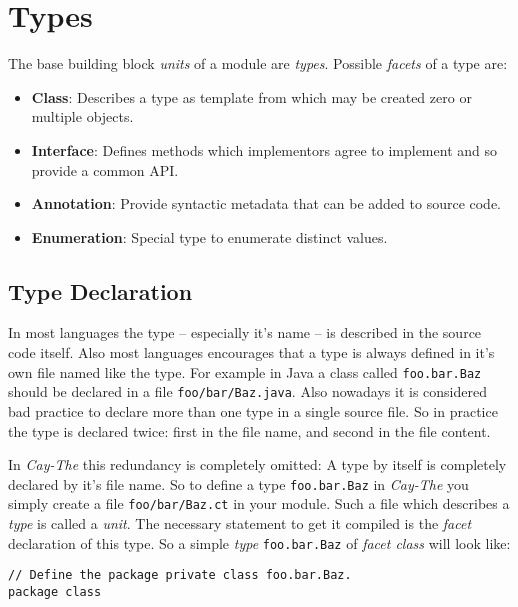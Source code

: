 \documentclass[11pt,a4paper]{report}
\begin{document}
\section{Types}


The base building block \textit{units} of a module are \textit{types}. Possible \textit{facets} of a type are:

\begin{itemize}
    \item \textbf{Class}: Describes a type as template from which may be created zero or multiple objects.
    \item \textbf{Interface}: Defines methods which implementors agree to implement and so provide a common API.
    \item \textbf{Annotation}: Provide syntactic metadata that can be added to source code.
    \item \textbf{Enumeration}: Special type to enumerate distinct values.
\end{itemize}

\subsection{Type Declaration}

In most languages the type -- especially it's name -- is described in the source code itself. Also most languages encourages that a type is always defined in it's own file named like the type. For example in Java a class called \texttt{foo.bar.Baz} should be declared in a file \texttt{foo/bar/Baz.java}. Also nowadays it is considered bad practice to declare more than one type in a single source file. So in practice the type is declared twice: first in the file name, and second in the file content.

In \textit{Cay-The} this redundancy is completely omitted: A type by itself is completely declared by it's file name. So to define a type \texttt{foo.bar.Baz} in \textit{Cay-The} you simply create a file \texttt{foo/bar/Baz.ct} in your module. Such a file which describes a \textit{type} is called a \textit{unit}. The necessary statement to get it compiled is the \textit{facet} declaration of this type. So a simple \textit{type} \texttt{foo.bar.Baz} of \textit{facet class} will look like:

\begin{lstlisting}[language=CayThe, title=Module source file foo/bar/Baz.ct]
// Define the package private class foo.bar.Baz.
package class
\end{lstlisting}
\end{document}
